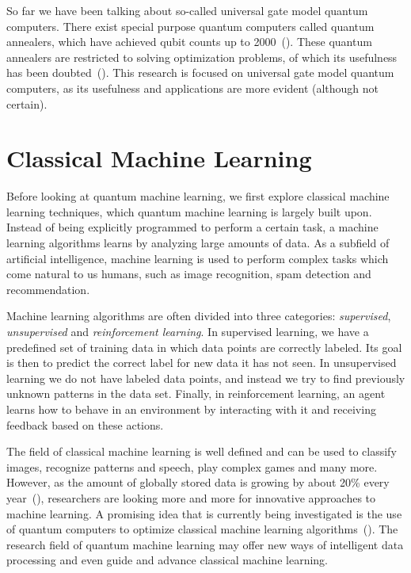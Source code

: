 \documentclass[a4paper,10pt]{article}
\begin{document}
So far we have been talking about so-called universal gate model quantum computers.
There exist special purpose quantum computers called quantum annealers, which have achieved qubit counts up to 2000~(\cite{dwave-2000}).
These quantum annealers are restricted to solving optimization problems, of which its usefulness has been doubted~(\cite{how-quantum-dwave, aaronson-dwave, detecting-quantum-speedup}).
This research is focused on universal gate model quantum computers, as its usefulness and applications are more evident (although not certain).

\section{Classical Machine Learning} \label{sec:classical-ml}
Before looking at quantum machine learning, we first explore classical machine learning techniques, which quantum machine learning is largely built upon.
Instead of being explicitly programmed to perform a certain task, a machine learning algorithms learns by analyzing large amounts of data.
As a subfield of artificial intelligence, machine learning is used to perform complex tasks which come natural to us humans, such as image recognition, spam detection and recommendation.

Machine learning algorithms are often divided into three categories: \emph{supervised}, \emph{unsupervised} and \emph{reinforcement learning}.
In supervised learning, we have a predefined set of training data in which data points are correctly labeled.
Its goal is then to predict the correct label for new data it has not seen.
In unsupervised learning we do not have labeled data points, and instead we try to find previously unknown patterns in the data set.
Finally, in reinforcement learning, an agent learns how to behave in an environment by interacting with it and receiving feedback based on these actions.

The field of classical machine learning is well defined and can be used to classify images, recognize patterns and speech, play complex games and many more.
However, as the amount of globally stored data is growing by about 20\% every year~(\cite{hilbert2011world}), researchers are looking more and more for innovative approaches to machine learning.
A promising idea that is currently being investigated is the use of quantum computers to optimize classical machine learning algorithms~(\cite{schuld2015introduction}).
The research field of quantum machine learning may offer new ways of intelligent data processing and even guide and advance classical machine learning.
\end{document}
